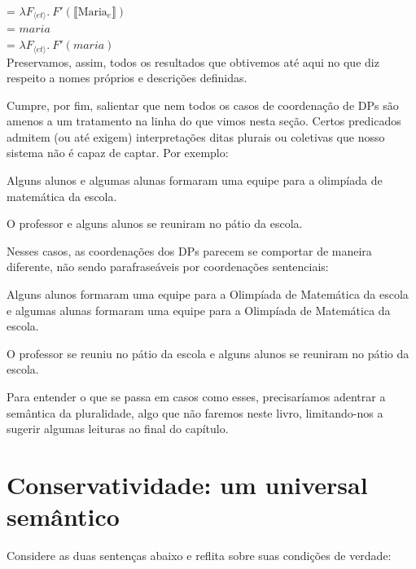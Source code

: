 \n {} = $\lambda F_{\langle
et\rangle}.\ F'(\llbracket\text{Maria}_{e}\rrbracket)$\\
\n {} = $maria$\\
\n {} = $\lambda F_{\langle
et\rangle}.\ F'(maria)$\\

\n Preservamos, assim, todos os resultados que obtivemos até aqui no
que diz respeito a nomes próprios e descrições definidas.

Cumpre, por fim, salientar que nem todos os casos de coordenação de DPs são amenos a um tratamento na linha do que vimos nesta seção. Certos predicados admitem (ou até exigem) interpretações ditas plurais ou coletivas que nosso sistema não é capaz de captar. Por exemplo:

\begin{exe}
	
\ex Alguns alunos e algumas alunas formaram uma equipe para a olimpíada de matemática da escola.

\ex O professor e alguns alunos se reuniram no pátio da escola.

\end{exe} 

\n Nesses casos, as coordenações dos DPs parecem se comportar de maneira diferente, não sendo parafraseáveis por coordenações sentenciais:

\begin{exe}
	
	\ex Alguns alunos formaram uma equipe para a Olimpíada de Matemática da escola e algumas alunas formaram uma equipe para a Olimpíada de Matemática da escola.
	
	\ex O professor se reuniu no pátio da escola e alguns alunos se reuniram no pátio da escola.
	
\end{exe} 


\n Para entender o que se passa em casos como esses, precisaríamos adentrar a semântica da pluralidade, algo que não faremos neste livro, limitando-nos a sugerir algumas leituras ao final do capítulo.

\section{Conservatividade: um universal semântico}

Considere as duas sentenças abaixo e reflita sobre suas condições
de verdade:


